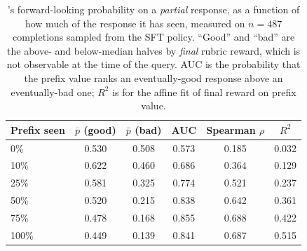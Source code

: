 \begin{table}[t]\centering\small
\caption{\jev{}'s forward-looking probability on a \emph{partial} response,
as a function of how much of the response it has seen, measured on
$n=487$ completions sampled from the SFT policy. ``Good'' and ``bad'' are
the above- and below-median halves by \emph{final} rubric reward, which is not
observable at the time of the query. AUC is the probability that the prefix
value ranks an eventually-good response above an eventually-bad one; $R^2$ is
for the affine fit of final reward on prefix value.}
\label{tab:calib}
\begin{tabular}{lccccc}
\toprule
Prefix seen & $\bar{p}$ (good) & $\bar{p}$ (bad) & AUC & Spearman $\rho$ & $R^2$ \\
\midrule
0\% & 0.530 & 0.508 & 0.573 & 0.185 & 0.032 \\
10\% & 0.622 & 0.460 & 0.686 & 0.364 & 0.129 \\
25\% & 0.581 & 0.325 & 0.774 & 0.521 & 0.237 \\
50\% & 0.520 & 0.215 & 0.838 & 0.642 & 0.361 \\
75\% & 0.478 & 0.168 & 0.855 & 0.688 & 0.422 \\
100\% & 0.449 & 0.139 & 0.841 & 0.687 & 0.515 \\
\bottomrule
\end{tabular}
\end{table}
